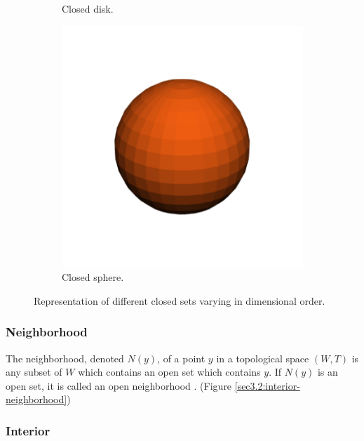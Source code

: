 \documentclass[a4paper,11pt,oneside]{article}
\begin{document}
\begin{figure}[ht]
\begin{subfigure}[b]{0.2\textwidth}
		\caption{Closed disk.}
	\end{subfigure}
	\hfill
	\begin{subfigure}[b]{0.2\textwidth}
		\centering
		\includegraphics[width=\textwidth]{section3/3.2/closed-sphere.png}
		\caption{Closed sphere.}
	\end{subfigure}
	\hfill
	\caption{Representation of different closed sets varying in dimensional order.}
	\label{sec3.2:closed-sets}
\end{figure}

\subsubsection{Neighborhood}
     
\begin{definition}
	The neighborhood, denoted $N(y)$, of a point $y$ in a topological space $(W, T)$ is any subset of $W$ which contains an open set which contains $y$. If $N(y)$ is an open set, it is called an open neighborhood \cite{Requicha1978MathematicalFO}. (Figure \ref{sec3.2:interior-neighborhood})
\end{definition}
    
\subsubsection{Interior}
     
\end{document}
